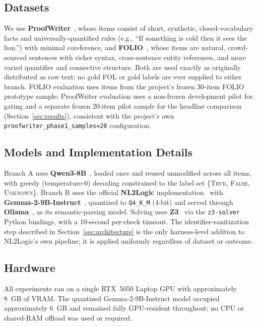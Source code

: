 \documentclass[conference]{IEEEtran}
\begin{document}
\subsection{Datasets}
We use \textbf{ProofWriter}~\cite{tafjord2021proofwriter}, whose items consist of short, synthetic, closed-vocabulary facts and universally-quantified rules (e.g., ``If something is cold then it sees the lion.'') with minimal coreference, and \textbf{FOLIO}~\cite{han2024folio}, whose items are natural, crowd-sourced sentences with richer syntax, cross-sentence entity references, and more varied quantifier and connective structure. Both are used exactly as originally distributed as raw text; no gold FOL or gold labels are ever supplied to either branch. FOLIO evaluation uses items from the project's frozen 30-item FOLIO prototype sample; ProofWriter evaluation uses a non-frozen development pilot for gating and a separate frozen 20-item pilot sample for the headline comparison (Section~\ref{sec:results}), consistent with the project's own \texttt{proofwriter\_phase1\_samples=20} configuration.

\subsection{Models and Implementation Details}
\label{sec:models}
Branch A uses \textbf{Qwen3-8B}~\cite{qwen3report}, loaded once and reused unmodified across all items, with greedy (temperature-0) decoding constrained to the label set \{\textsc{True}, \textsc{False}, \textsc{Unknown}\}. Branch B uses the official \textbf{NL2Logic} implementation~\cite{putra2026nl2logic} with \textbf{Gemma-2-9B-Instruct}~\cite{gemma2report}, quantized to \texttt{Q4\_K\_M} (4-bit) and served through \textbf{Ollama}~\cite{ollama}, as its semantic-parsing model. Solving uses \textbf{Z3}~\cite{demoura2008z3} via the \texttt{z3-solver}~\cite{z3solver} Python bindings, with a 10-second per-check timeout. The identifier-sanitization step described in Section~\ref{sec:architecture} is the only harness-level addition to NL2Logic's own pipeline; it is applied uniformly regardless of dataset or outcome.

\subsection{Hardware}
All experiments ran on a single RTX~5050 Laptop GPU with approximately 8~GB of VRAM. The quantized Gemma-2-9B-Instruct model occupied approximately 6~GB and remained fully GPU-resident throughout; no CPU or shared-RAM offload was used or required.
\end{document}
